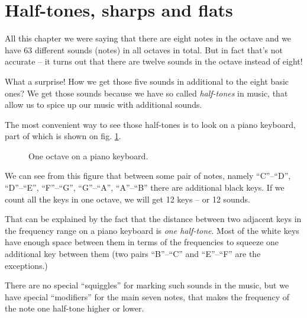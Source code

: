 \documentclass[../sparc.tex]{subfiles}
\begin{document}
\newpage
\section{Half-tones, sharps and flats}

All this chapter we were saying that there are eight notes in the octave and we
have 63 different sounds (notes) in all octaves in total.  But in fact that's
not accurate -- it turns out that there are twelve sounds in the octave instead
of eight!

What a surprise!  How we get those five sounds in additional to the eight basic
ones?  We get those sounds because we have so called \emph{half-tones} in music,
that allow us to spice up our music with additional sounds.

The most convenient way to see those half-tones is to look on a piano keyboard,
part of which is shown on fig. \ref{fig:piano-keyboard}.

\begin{figure}[H]
  \centering
  \label{fig:piano-keyboard}
  \caption{One octave on a piano keyboard.}
\end{figure}

We can see from this figure that between some pair of notes, namely ``C''--``D'',
``D''--``E'', ``F''--``G'', ``G''--``A'', ``A''--``B'' there are additional black
keys.  If we count all the keys in one octave, we will get 12 keys -- or 12
sounds.

That can be explained by the fact that the distance between two adjacent keys in
the frequency range on a piano keyboard is \emph{one half-tone}.  Most of the
white keys have enough space between them in terms of the frequencies to squeeze
one additional key between them (two pairs ``B''--``C'' and ``E''--``F'' are the
exceptions.)

There are no special ``squiggles'' for marking such sounds in the music, but we
have special ``modifiers'' for the main seven notes, that makes the frequency of
the note one half-tone higher or lower.
\end{document}
